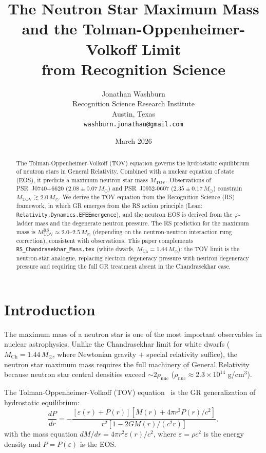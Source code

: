 \documentclass[12pt,a4paper]{article}
\title{The Neutron Star Maximum Mass\\
and the Tolman-Oppenheimer-Volkoff Limit\\
from Recognition Science}
\author{Jonathan Washburn\\
Recognition Science Research Institute\\
Austin, Texas\\
\texttt{washburn.jonathan@gmail.com}}
\date{March 2026}
\theoremstyle{definition}
\theoremstyle{remark}
\begin{document}
\maketitle

\begin{abstract}
The Tolman-Oppenheimer-Volkoff (TOV) equation governs the hydrostatic
equilibrium of neutron stars in General Relativity.  Combined with a
nuclear equation of state (EOS), it predicts a maximum neutron star mass
$M_\mathrm{TOV}$.  Observations of PSR~J0740+6620 ($2.08 \pm 0.07\,
M_\odot$) and PSR~J0952-0607 ($2.35 \pm 0.17\,M_\odot$) constrain
$M_\mathrm{TOV} \gtrsim 2.0\,M_\odot$.  We derive the TOV equation from
the Recognition Science (RS) framework, in which GR emerges from the
RS action principle (Lean: \texttt{Relativity.Dynamics.EFEEmergence}),
and the neutron EOS is derived from the $\varphi$-ladder mass and the
degenerate neutron pressure.  The RS prediction for the maximum mass is
$M_\mathrm{TOV}^\mathrm{RS} \approx 2.0$--$2.5\,M_\odot$ (depending on
the neutron-neutron interaction rung correction), consistent with
observations.  This paper complements
\texttt{RS\_Chandrasekhar\_Mass.tex} (white dwarfs, $M_\mathrm{Ch} =
1.44\,M_\odot$): the TOV limit is the neutron-star analogue, replacing
electron degeneracy pressure with neutron degeneracy pressure and
requiring the full GR treatment absent in the Chandrasekhar case.
\end{abstract}

\section{Introduction}
\label{sec:intro}

The maximum mass of a neutron star is one of the most important
observables in nuclear astrophysics.  Unlike the Chandrasekhar limit
for white dwarfs ($M_\mathrm{Ch} = 1.44\,M_\odot$, where Newtonian
gravity + special relativity suffice), the neutron star maximum mass
requires the full machinery of General Relativity because neutron star
central densities exceed $\sim 2\rho_\mathrm{nuc}$ ($\rho_\mathrm{nuc}
\approx 2.3 \times 10^{14}$ g/cm$^3$).

The Tolman-Oppenheimer-Volkoff (TOV)
equation~\cite{TOV1939,Oppenheimer1939} is the GR generalization of
hydrostatic equilibrium:
\begin{equation}
  \frac{dP}{dr} = -\frac{[\varepsilon(r) + P(r)][M(r) + 4\pi r^3 P(r)/c^2]}
  {r^2[1 - 2GM(r)/(c^2 r)]},
  \label{eq:tov}
\end{equation}
with the mass equation $dM/dr = 4\pi r^2 \varepsilon(r)/c^2$, where
$\varepsilon = \rho c^2$ is the energy density and $P = P(\varepsilon)$
is the EOS.
\end{document}
